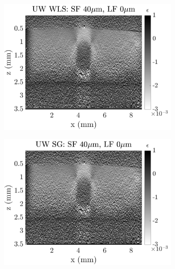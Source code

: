 \begin{figure}[h]
	\centering
    \begin{subfigure}{0.49\textwidth}
    	\centering
        \includegraphics[width=\textwidth]{appendix_figs/wls_fr40_lr0.png}
    \end{subfigure}
    \begin{subfigure}{0.49\textwidth}
    	\centering
        \includegraphics[width=\textwidth]{appendix_figs/uwsg_fr40_lr0.png}
    \end{subfigure}
    \\
    \begin{subfigure}{0.49\textwidth}
    	\centering

\end{subfigure}
\end{figure}
